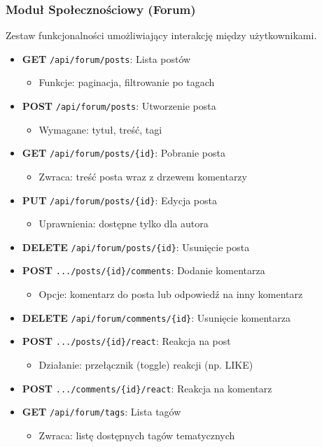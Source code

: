\documentclass[11pt,a4paper]{article}
\numberwithin{equation}{section}
\begin{document}
\subsubsection{Moduł Społecznościowy (Forum)}
Zestaw funkcjonalności umożliwiający interakcję między użytkownikami.
\begin{itemize}
    \item \textbf{GET} \texttt{/api/forum/posts}: Lista postów
        \begin{itemize}
            \item Funkcje: paginacja, filtrowanie po tagach
        \end{itemize}
    \item \textbf{POST} \texttt{/api/forum/posts}: Utworzenie posta
        \begin{itemize}
            \item Wymagane: tytuł, treść, tagi
        \end{itemize}
    \item \textbf{GET} \texttt{/api/forum/posts/\{id\}}: Pobranie posta
        \begin{itemize}
            \item Zwraca: treść posta wraz z drzewem komentarzy
        \end{itemize}
    \item \textbf{PUT} \texttt{/api/forum/posts/\{id\}}: Edycja posta
        \begin{itemize}
            \item Uprawnienia: dostępne tylko dla autora
        \end{itemize}
    \item \textbf{DELETE} \texttt{/api/forum/posts/\{id\}}: Usunięcie posta
    \item \textbf{POST} \texttt{.../posts/\{id\}/comments}: Dodanie komentarza
        \begin{itemize}
            \item Opcje: komentarz do posta lub odpowiedź na inny komentarz
        \end{itemize}
    \item \textbf{DELETE} \texttt{/api/forum/comments/\{id\}}: Usunięcie komentarza
    \item \textbf{POST} \texttt{.../posts/\{id\}/react}: Reakcja na post
        \begin{itemize}
            \item Działanie: przełącznik (toggle) reakcji (np. LIKE)
        \end{itemize}
    \item \textbf{POST} \texttt{.../comments/\{id\}/react}: Reakcja na komentarz
    \item \textbf{GET} \texttt{/api/forum/tags}: Lista tagów
        \begin{itemize}
            \item Zwraca: listę dostępnych tagów tematycznych
        \end{itemize}
\end{itemize}
\end{document}
